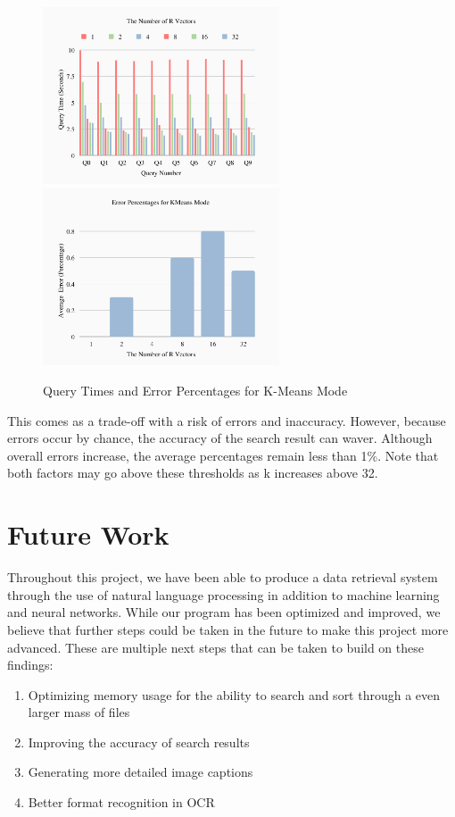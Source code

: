 \documentclass[11pt, a4paper, twocolumn]{article}
\begin{document}
\begin{figure}[htp]
    \centering
    \includegraphics[width=7cm]{kmeans_query.png}
     \includegraphics[width=7cm]{kmeans_err.png}
    \caption{Query Times and Error Percentages for K-Means Mode}
    \label{fig:kmeans}
\end{figure}
This comes as a trade-off with a risk of errors and inaccuracy. However, because errors occur by chance, the accuracy of the search result can waver. Although overall errors increase, the average percentages remain less than 1\%. Note that both factors may go above these thresholds as {k} increases above 32.

\section{\Large{Future Work}}
Throughout this project, we have been able to produce a data retrieval system through the use of natural language processing in addition to machine learning and neural networks. While our program has been optimized and improved, we believe that further steps could be taken in the future to make this project more advanced. These are multiple next steps that can be taken to build on these findings:
\begin{enumerate}
\item Optimizing memory usage for the ability to search and sort through a even larger mass of files
\item Improving the accuracy of search results 
\item Generating more detailed image captions
\item Better format recognition in OCR 
\end{enumerate}
\end{document}

